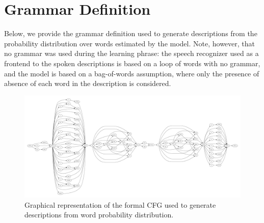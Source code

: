 \section{Grammar Definition}
Below, we provide the grammar definition used to generate descriptions from the probability distribution over words estimated by the model.
Note, however, that no grammar was used during the learning phrase: the speech recognizer used as a frontend to the spoken descriptions is based on a loop of words with no grammar, and the \AffWords{} model is based on a bag-of-words assumption, where only the presence of absence of each word in the description is considered.

\begin{figure}
  \includegraphics[width=\textwidth, angle=90]{figures/grammar}
  \caption{Graphical representation of the formal \ac{CFG} used to generate descriptions from word probability distribution.}
\end{figure}

